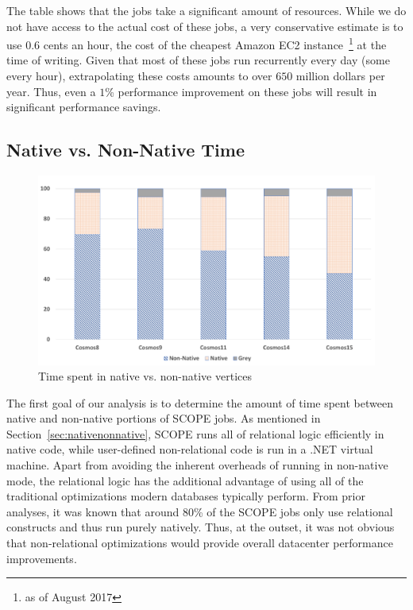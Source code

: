 The table shows that the jobs take a significant amount of resources. 
While we do not have access to the actual cost of these jobs, a very conservative estimate is to use $0.6$ cents an hour, the cost of the cheapest Amazon EC2 instance~\footnote{as of August 2017} at the time of writing. 
Given that most of these jobs run recurrently every day (some every hour), extrapolating these costs amounts to over $650$ million dollars per year. 
Thus, even a $1$\% performance improvement on these jobs will result in significant performance savings. 


\subsection{Native vs. Non-Native Time}
\begin{figure}[ht]
\includegraphics[width=2\columnwidth]{graphs/proportions.pdf}
\caption{Time spent in native vs. non-native vertices}
\label{fig:nativeVsNonNative}
\end{figure}
The first goal of our analysis is to determine the amount of time spent between native and non-native portions of SCOPE jobs. 
As mentioned in Section~\ref{sec:nativenonnative}, SCOPE runs all of relational logic efficiently in native code, while user-defined non-relational code is run in a .NET virtual machine. 
Apart from avoiding the inherent overheads of running in non-native mode, the relational logic has the additional advantage of using all of the traditional optimizations modern databases typically perform.
From prior analyses, it was known that around $80$\% of the SCOPE jobs only use relational constructs and thus run purely natively. 
Thus, at the outset, it was not obvious that non-relational optimizations would provide overall datacenter performance improvements. 


